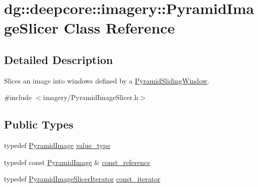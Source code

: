 \hypertarget{classdg_1_1deepcore_1_1imagery_1_1_pyramid_image_slicer}{}\section{dg\+:\+:deepcore\+:\+:imagery\+:\+:Pyramid\+Image\+Slicer Class Reference}
\label{classdg_1_1deepcore_1_1imagery_1_1_pyramid_image_slicer}


\subsection{Detailed Description}
Slices an image into windows defined by a \hyperlink{classdg_1_1deepcore_1_1imagery_1_1_pyramid_sliding_window}{Pyramid\+Sliding\+Window}. 

{\ttfamily \#include $<$imagery/\+Pyramid\+Image\+Slicer.\+h$>$}

\subsection*{Public Types}
\begin{DoxyCompactItemize}
\item 
typedef \hyperlink{structdg_1_1deepcore_1_1imagery_1_1_pyramid_image}{Pyramid\+Image} \hyperlink{classdg_1_1deepcore_1_1imagery_1_1_pyramid_image_slicer_a6a2ca5ffdf4ce25771ce96dec3be678a}{value\+\_\+type}
\item 
typedef const \hyperlink{structdg_1_1deepcore_1_1imagery_1_1_pyramid_image}{Pyramid\+Image} \& \hyperlink{classdg_1_1deepcore_1_1imagery_1_1_pyramid_image_slicer_ae420ea4b1c5ecc7801eb1a827cfa6252}{const\+\_\+reference}
\item 
typedef \hyperlink{classdg_1_1deepcore_1_1imagery_1_1_pyramid_image_slicer_iterator}{Pyramid\+Image\+Slicer\+Iterator} \hyperlink{classdg_1_1deepcore_1_1imagery_1_1_pyramid_image_slicer_ae7aff5a41f1137d54f566127aa2bb957}{const\+\_\+iterator}
\end{DoxyCompactItemize}
